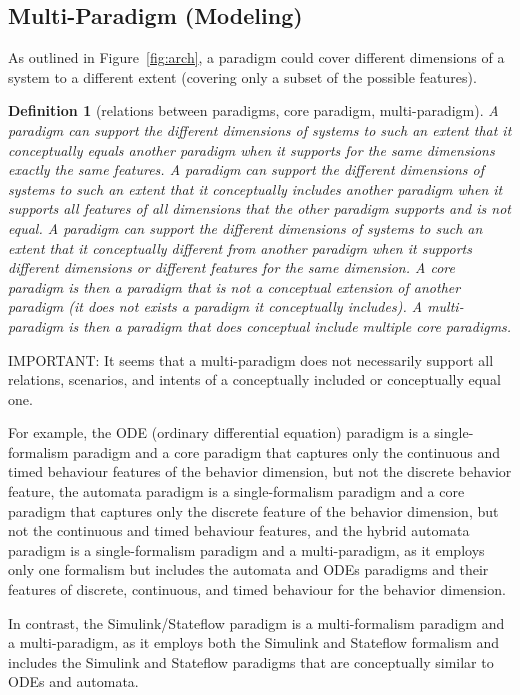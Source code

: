 \documentclass[a4paper,8pt]{article}
\newtheorem{definition}{\bf Definition}
\begin{document}
\subsection{Multi-Paradigm (Modeling)}
%
As outlined in Figure~\ref{fig:arch}, a paradigm could cover different dimensions of a system to a different extent (covering only a subset of the possible features). 
%
\begin{definition}[relations between paradigms, core paradigm, multi-paradigm]
A paradigm can support the different dimensions of systems to such an extent that it \emph{conceptually equals} another paradigm when it supports for the same dimensions exactly the same features. 
%
A paradigm can support the different dimensions of systems to such an extent that it \emph{conceptually includes} another paradigm when it supports all features of all  dimensions that the other paradigm supports and is not equal. 
%
A paradigm can support the different dimensions of systems to such an extent that it \emph{conceptually different} from another paradigm when it supports different dimensions or different features for the same dimension. 
%
A \emph{core paradigm} is then a paradigm that is not a conceptual extension of another paradigm (it does not exists a paradigm it conceptually includes).
%
A \emph{multi-paradigm} is then a paradigm that does conceptual include multiple core paradigms.
%
\end{definition}

IMPORTANT: It seems that a multi-paradigm does not necessarily support all relations, scenarios, and intents of a conceptually included or conceptually equal one.



For example, the ODE (ordinary differential equation) paradigm is a single-formalism paradigm and a core paradigm that captures only the continuous and timed behaviour features of the behavior dimension, but not the discrete behavior feature,
%
the automata paradigm is a single-formalism paradigm and a core paradigm that captures only the discrete feature of the behavior dimension, but not the continuous and timed behaviour features, and
%
the hybrid automata paradigm is a single-formalism paradigm and a multi-paradigm, as it employs only one formalism but includes the automata and ODEs paradigms and their features of discrete, continuous, and timed behaviour for the behavior dimension. 


In contrast, the Simulink/Stateflow paradigm is a multi-formalism paradigm and a multi-paradigm, as it employs both the Simulink and Stateflow formalism and includes the Simulink and Stateflow paradigms that are conceptually similar to ODEs and automata.
\end{document}
